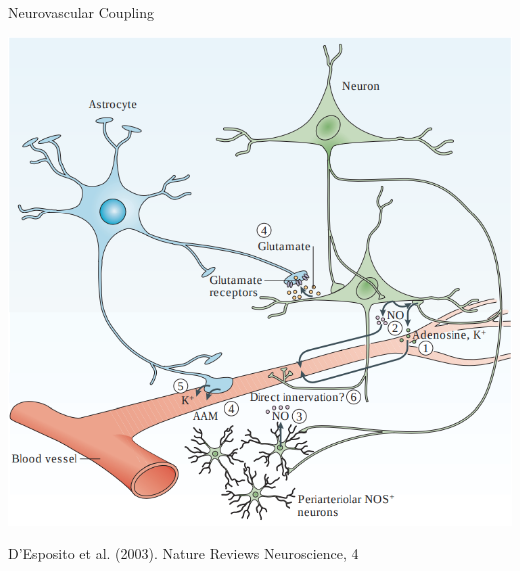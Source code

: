 \documentclass[aspectratio=169,xcolor=dvipsnames]{beamer}
\begin{document}
\begin{frame}{Neurovascular Coupling}

\includegraphics[width=.5\textwidth]{imgs/neurovasc3}

\tiny{D’Esposito et al. (2003). Nature Reviews Neuroscience, 4}
\end{frame}

\end{document}
